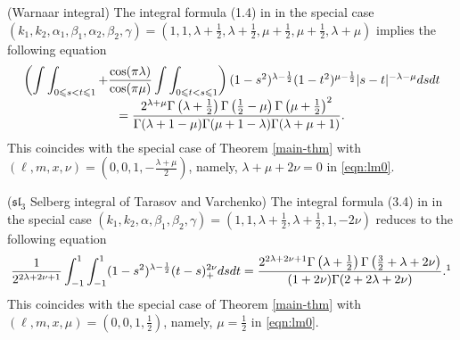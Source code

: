 \documentclass[12pt]{article}
\numberwithin{equation}{section}
\newcommand{\comma}{{,}}
\begin{document}
\begin{example}
  \label{ex:2}(Warnaar integral) The integral formula (1.4) in
  {\cite{warnaar2010sl3}} in the special case $(k_1, k_2, \alpha_1, \beta_1,
  \alpha_2 \comma \beta_2, \gamma) = \left( 1, 1, \lambda + \frac{1}{2},
  \lambda + \frac{1}{2}, \mu + \frac{1}{2}, \mu + \frac{1}{2} \comma \lambda +
  \mu \right)$ implies the following equation
  \begin{equation*}
      \begin{array}[]{c}
     \left( \displaystyle\int \displaystyle\int_{0 \leqslant s < t
    \leqslant 1} + \frac{\cos (\pi \lambda)}{\cos (\pi \mu)} \displaystyle\int \displaystyle\int_{0
    \leqslant t < s \leqslant 1} \right) (1 - s^2)^{\lambda - \frac{1}{2}} (1
    - t^2)^{\mu - \frac{1}{2}} | s - t |^{- \lambda - \mu} d s d t
    \\
    \displaystyle= \frac{{2^{\lambda + \mu}}\Gamma \left( \lambda + \frac{1}{2} \right) \Gamma \left(
    \frac{1}{2} - \mu \right) \Gamma \left( \mu + \frac{1}{2}
    \right)^2}{\Gamma (\lambda + 1 - \mu) \Gamma (\mu + 1 - \lambda) \Gamma
    (\lambda + \mu + 1)}.
      \end{array}
  \end{equation*}
  This coincides with the special case of Theorem \ref{main-thm} with $(\ell,
  m, x, \nu) = \left( 0, 0, 1, - \frac{\lambda + \mu}{2} \right)$, namely,
  $\lambda+\mu+2\nu=0$ in
  \eqref{eqn:lm0}.
\end{example}

\begin{example}
  \label{ex:3}($\mathfrak{s}\mathfrak{l}_3$ Selberg integral of Tarasov and
  Varchenko) The integral formula (3.4) in {\cite{tarasov2003selberg}} in the
  special case $(k_1, k_2, \alpha, \beta_1, \beta_2, \gamma) = \left( 1, 1,
  \lambda + \frac{1}{2}, \lambda + \frac{1}{2}, 1, - 2 \nu \right)$ reduces to
  the following equation
  \begin{equation*}
    \frac{1}{2^{2 \lambda + 2 \nu + 1}} \displaystyle\displaystyle\int_{- 1}^1 \displaystyle\int_{- 1}^1 (1 -
    s^2)^{\lambda - \frac{1}{2}} (t - s)_+^{2 \nu} d s d t = \frac{2^{2\lambda+2\nu+1}\Gamma
    \left( \lambda + \frac{1}{2} \right) \Gamma \left( \frac{3}{2} + \lambda +
2 \nu \right)}{(1 + 2 \nu) \Gamma (2 + 2 \lambda + 2 \nu)} \mbox{.\footnotemark}
  \end{equation*}
  This coincides with the special case of Theorem \ref{main-thm} with $(\ell,
  m, x, \mu) = \left( 0, 0, 1, \frac{1}{2} \right)$, namely, $\mu=\frac{1}{2}$ in \eqref{eqn:lm0}.
\end{example}
\end{document}
